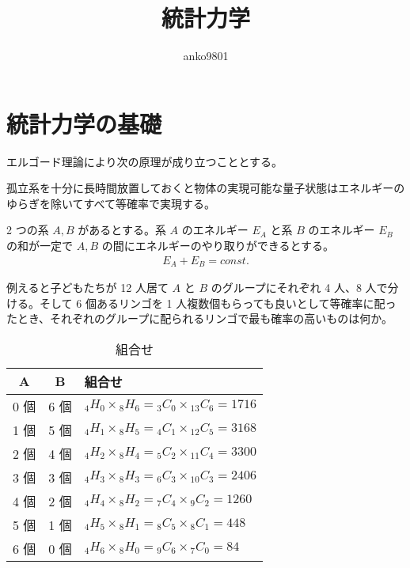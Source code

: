 \documentclass[a4paper,11pt]{jlreq}
\title{統計力学}
\author{anko9801}
\begin{document}
\maketitle
\tableofcontents
\clearpage

\section{統計力学の基礎}
エルゴード理論により次の原理が成り立つこととする。
\begin{axiom}[等確率の原理]
  孤立系を十分に長時間放置しておくと物体の実現可能な量子状態はエネルギーのゆらぎを除いてすべて等確率で実現する。
\end{axiom}

2 つの系 $A, B$ があるとする。系 $A$ のエネルギー $E_A$ と系 $B$ のエネルギー $E_B$ の和が一定で $A, B$ の間にエネルギーのやり取りができるとする。
\begin{align}
  E_A + E_B = const.
\end{align}

例えると子どもたちが 12 人居て $A$ と $B$ のグループにそれぞれ 4 人、8 人で分ける。そして 6 個あるリンゴを 1 人複数個もらっても良いとして等確率に配ったとき、それぞれのグループに配られるリンゴで最も確率の高いものは何か。
\begin{table}[hbtp]
  \label{table:micro}
  \centering
  \begin{tabular}{|c|c|l|}
    \hline
    A   & B   & 組合せ                                                         \\
    \hline
    0 個 & 6 個 & ${}_4H_0\times {}_{8}H_6 = {}_3C_0\times {}_{13}C_6 = 1716$ \\
    1 個 & 5 個 & ${}_4H_1\times {}_{8}H_5 = {}_4C_1\times {}_{12}C_5 = 3168$ \\
    2 個 & 4 個 & ${}_4H_2\times {}_{8}H_4 = {}_5C_2\times {}_{11}C_4 = 3300$ \\
    3 個 & 3 個 & ${}_4H_3\times {}_{8}H_3 = {}_6C_3\times {}_{10}C_3 = 2406$ \\
    4 個 & 2 個 & ${}_4H_4\times {}_{8}H_2 = {}_7C_4\times {}_{9}C_2 = 1260$  \\
    5 個 & 1 個 & ${}_4H_5\times {}_{8}H_1 = {}_8C_5\times {}_{8}C_1 = 448$   \\
    6 個 & 0 個 & ${}_4H_6\times {}_{8}H_0 = {}_9C_6\times {}_{7}C_0 = 84$    \\
    \hline
  \end{tabular}
  \caption{組合せ}
\end{table}
\end{document}
